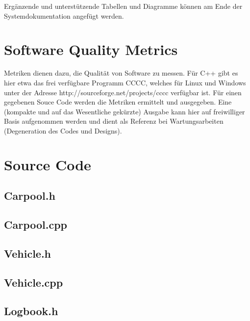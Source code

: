 Ergänzende und unterstützende Tabellen und Diagramme können am Ende der Systemdokumentation angefügt werden.


\section{Software Quality Metrics}

Metriken dienen dazu, die Qualität von Software zu messen. Für C++ gibt es hier
etwa das frei verfügbare Programm CCCC, welches für Linux und Windows unter
der Adresse http://sourceforge.net/projects/cccc verfügbar ist. Für einen gegebenen
Souce Code werden die Metriken ermittelt und ausgegeben. Eine (kompakte und auf
das Wesentliche gekürzte) Ausgabe kann hier auf freiwilliger Basis aufgenommen
werden und dient als Referenz bei Wartungsarbeiten (Degeneration des Codes und
Designs).

\section{Source Code}

\subsection{Carpool.h}

\subsection{Carpool.cpp}

\subsection{Vehicle.h}
\subsection{Vehicle.cpp}

\subsection{Logbook.h}
